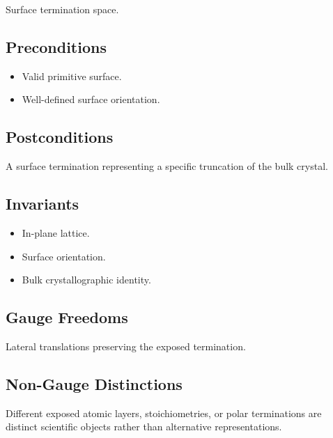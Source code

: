 Surface termination space.

\subsection{Preconditions}

\begin{itemize}
\item Valid primitive surface.
\item Well-defined surface orientation.
\end{itemize}

\subsection{Postconditions}

A surface termination representing a specific truncation of the bulk
crystal.

\subsection{Invariants}

\begin{itemize}
\item In-plane lattice.
\item Surface orientation.
\item Bulk crystallographic identity.
\end{itemize}

\subsection{Gauge Freedoms}

Lateral translations preserving the exposed termination.

\subsection{Non-Gauge Distinctions}

Different exposed atomic layers, stoichiometries, or polar terminations
are distinct scientific objects rather than alternative
representations.
